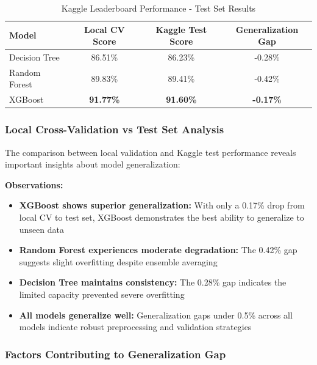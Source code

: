 \documentclass[12pt,a4paper]{article}
\begin{document}
\begin{table}[H]
\centering
\caption{Kaggle Leaderboard Performance - Test Set Results}
\begin{tabular}{lccc}
\toprule
\textbf{Model} & \textbf{Local CV Score} & \textbf{Kaggle Test Score} & \textbf{Generalization Gap} \\
\midrule
Decision Tree & 86.51\% & 86.23\% & -0.28\% \\
Random Forest & 89.83\% & 89.41\% & -0.42\% \\
XGBoost & \textbf{91.77\%} & \textbf{91.60\%} & \textbf{-0.17\%} \\
\bottomrule
\end{tabular}
\end{table}

\subsubsection{Local Cross-Validation vs Test Set Analysis}

The comparison between local validation and Kaggle test performance reveals important insights about model generalization:

\textbf{Observations:}
\begin{itemize}
    \item \textbf{XGBoost shows superior generalization:} With only a 0.17\% drop from local CV to test set, XGBoost demonstrates the best ability to generalize to unseen data
    \item \textbf{Random Forest experiences moderate degradation:} The 0.42\% gap suggests slight overfitting despite ensemble averaging
    \item \textbf{Decision Tree maintains consistency:} The 0.28\% gap indicates the limited capacity prevented severe overfitting
    \item \textbf{All models generalize well:} Generalization gaps under 0.5\% across all models indicate robust preprocessing and validation strategies
\end{itemize}

\subsubsection{Factors Contributing to Generalization Gap}
\end{document}

